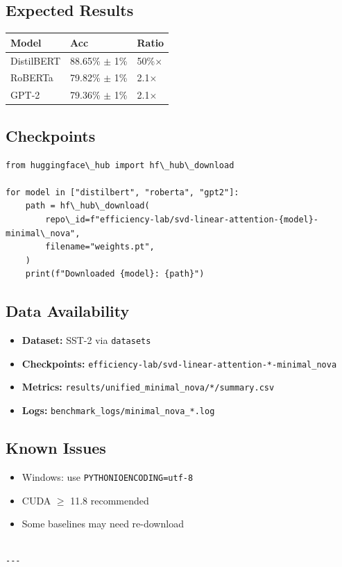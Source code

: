 \subsection{Expected Results}

\begin{table}[H]
\centering
\small
\begin{tabular}{lll}
\toprule
\textbf{Model} & \textbf{Acc} & \textbf{Ratio} \\
\midrule
DistilBERT & 88.65\% $\pm$ 1\% & 50\%$\times$ \\
RoBERTa & 79.82\% $\pm$ 1\% & 2.1$\times$ \\
GPT-2 & 79.36\% $\pm$ 1\% & 2.1$\times$ \\
\bottomrule
\end{tabular}
\end{table}

\subsection{Checkpoints}

\begin{lstlisting}
from huggingface\_hub import hf\_hub\_download

for model in ["distilbert", "roberta", "gpt2"]:
    path = hf\_hub\_download(
        repo\_id=f"efficiency-lab/svd-linear-attention-{model}-minimal\_nova",
        filename="weights.pt",
    )
    print(f"Downloaded {model}: {path}")
\end{lstlisting}

\subsection{Data Availability}

\begin{itemize}
\item \textbf{Dataset:} SST-2 via \texttt{datasets}
\item \textbf{Checkpoints:} \texttt{efficiency-lab/svd-linear-attention-*-minimal\_nova}
\item \textbf{Metrics:} \texttt{results/unified\_minimal\_nova/*/summary.csv}
\item \textbf{Logs:} \texttt{benchmark\_logs/minimal\_nova\_*.log}

\end{itemize}
\subsection{Known Issues}

\begin{itemize}
\item Windows: use \texttt{PYTHONIOENCODING=utf-8}
\item CUDA $\ge$ 11.8 recommended
\item Some baselines may need re-download
\end{itemize}
\begin{lstlisting}

---
\end{lstlisting}